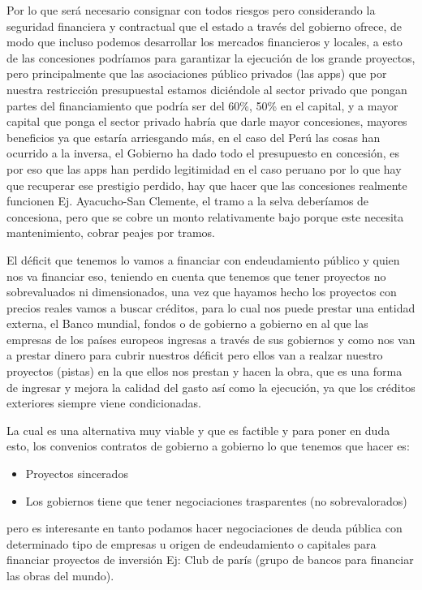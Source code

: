 \documentclass[
  jou,
  floatsintext,
  longtable,
  a4paper,
  nolmodern,
  notxfonts,
  notimes,
  12pt,
  colorlinks=true,linkcolor=blue,citecolor=blue,urlcolor=blue]{apa7}
\providecommand{\tightlist}{%
  \setlength{\itemsep}{0pt}\setlength{\parskip}{0pt}}
\begin{document}
Por lo que será necesario consignar con todos riesgos pero considerando
la seguridad financiera y contractual que el estado a través del
gobierno ofrece, de modo que incluso podemos desarrollar los mercados
financieros y locales, a esto de las concesiones podríamos para
garantizar la ejecución de los grande proyectos, pero principalmente que
las asociaciones público privados (las apps) que por nuestra restricción
presupuestal estamos diciéndole al sector privado que pongan partes del
financiamiento que podría ser del 60\%, 50\% en el capital, y a mayor
capital que ponga el sector privado habría que darle mayor concesiones,
mayores beneficios ya que estaría arriesgando más, en el caso del Perú
las cosas han ocurrido a la inversa, el Gobierno ha dado todo el
presupuesto en concesión, es por eso que las apps han perdido
legitimidad en el caso peruano por lo que hay que recuperar ese
prestigio perdido, hay que hacer que las concesiones realmente funcionen
Ej. Ayacucho-San Clemente, el tramo a la selva deberíamos de concesiona,
pero que se cobre un monto relativamente bajo porque este necesita
mantenimiento, cobrar peajes por tramos.

El déficit que tenemos lo vamos a financiar con endeudamiento público y
quien nos va financiar eso, teniendo en cuenta que tenemos que tener
proyectos no sobrevaluados ni dimensionados, una vez que hayamos hecho
los proyectos con precios reales vamos a buscar créditos, para lo cual
nos puede prestar una entidad externa, el Banco mundial, fondos o de
gobierno a gobierno en al que las empresas de los países europeos
ingresas a través de sus gobiernos y como nos van a prestar dinero para
cubrir nuestros déficit pero ellos van a realzar nuestro proyectos
(pistas) en la que ellos nos prestan y hacen la obra, que es una forma
de ingresar y mejora la calidad del gasto así como la ejecución, ya que
los créditos exteriores siempre viene condicionadas.

La cual es una alternativa muy viable y que es factible y para poner en
duda esto, los convenios contratos de gobierno a gobierno lo que tenemos
que hacer es:

\begin{itemize}
\tightlist
\item
  Proyectos sincerados
\item
  Los gobiernos tiene que tener negociaciones trasparentes (no
  sobrevalorados)
\end{itemize}

pero es interesante en tanto podamos hacer negociaciones de deuda
pública con determinado tipo de empresas u origen de endeudamiento o
capitales para financiar proyectos de inversión Ej: Club de parís (grupo
de bancos para financiar las obras del mundo).
\end{document}
